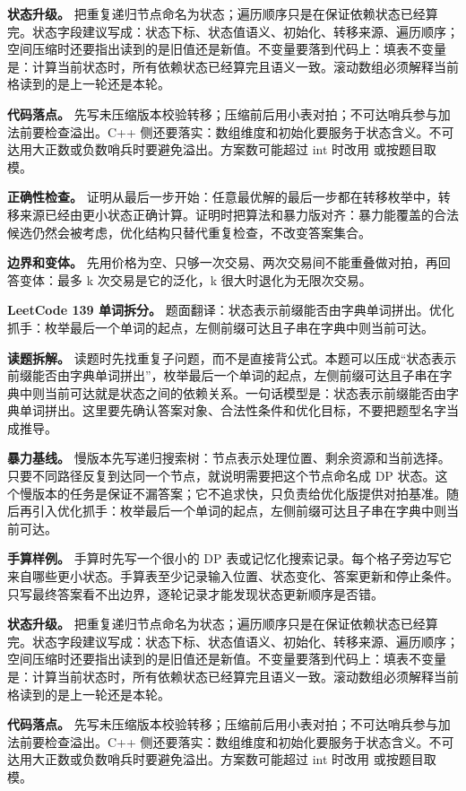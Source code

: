 \textbf{状态升级。} 把重复递归节点命名为状态；遍历顺序只是在保证依赖状态已经算完。状态字段建议写成：状态下标、状态值语义、初始化、转移来源、遍历顺序；空间压缩时还要指出读到的是旧值还是新值。不变量要落到代码上：填表不变量是：计算当前状态时，所有依赖状态已经算完且语义一致。滚动数组必须解释当前格读到的是上一轮还是本轮。

\textbf{代码落点。} 先写未压缩版本校验转移；压缩前后用小表对拍；不可达哨兵参与加法前要检查溢出。C++ 侧还要落实：数组维度和初始化要服务于状态含义。不可达用大正数或负数哨兵时要避免溢出。方案数可能超过 int 时改用  或按题目取模。

\textbf{正确性检查。} 证明从最后一步开始：任意最优解的最后一步都在转移枚举中，转移来源已经由更小状态正确计算。证明时把算法和暴力版对齐：暴力能覆盖的合法候选仍然会被考虑，优化结构只替代重复检查，不改变答案集合。

\textbf{边界和变体。} 先用价格为空、只够一次交易、两次交易间不能重叠做对拍，再回答变体：最多 k 次交易是它的泛化，k 很大时退化为无限次交易。

\noindent\textbf{LeetCode 139 单词拆分。} 题面翻译：状态表示前缀能否由字典单词拼出。优化抓手：枚举最后一个单词的起点，左侧前缀可达且子串在字典中则当前可达。

\textbf{读题拆解。} 读题时先找重复子问题，而不是直接背公式。本题可以压成“状态表示前缀能否由字典单词拼出”，枚举最后一个单词的起点，左侧前缀可达且子串在字典中则当前可达就是状态之间的依赖关系。一句话模型是：状态表示前缀能否由字典单词拼出。这里要先确认答案对象、合法性条件和优化目标，不要把题型名字当成推导。

\textbf{暴力基线。} 慢版本先写递归搜索树：节点表示处理位置、剩余资源和当前选择。只要不同路径反复到达同一个节点，就说明需要把这个节点命名成 DP 状态。这个慢版本的任务是保证不漏答案；它不追求快，只负责给优化版提供对拍基准。随后再引入优化抓手：枚举最后一个单词的起点，左侧前缀可达且子串在字典中则当前可达。

\textbf{手算样例。} 手算时先写一个很小的 DP 表或记忆化搜索记录。每个格子旁边写它来自哪些更小状态。手算表至少记录输入位置、状态变化、答案更新和停止条件。只写最终答案看不出边界，逐轮记录才能发现状态更新顺序是否错。

\textbf{状态升级。} 把重复递归节点命名为状态；遍历顺序只是在保证依赖状态已经算完。状态字段建议写成：状态下标、状态值语义、初始化、转移来源、遍历顺序；空间压缩时还要指出读到的是旧值还是新值。不变量要落到代码上：填表不变量是：计算当前状态时，所有依赖状态已经算完且语义一致。滚动数组必须解释当前格读到的是上一轮还是本轮。

\textbf{代码落点。} 先写未压缩版本校验转移；压缩前后用小表对拍；不可达哨兵参与加法前要检查溢出。C++ 侧还要落实：数组维度和初始化要服务于状态含义。不可达用大正数或负数哨兵时要避免溢出。方案数可能超过 int 时改用  或按题目取模。

